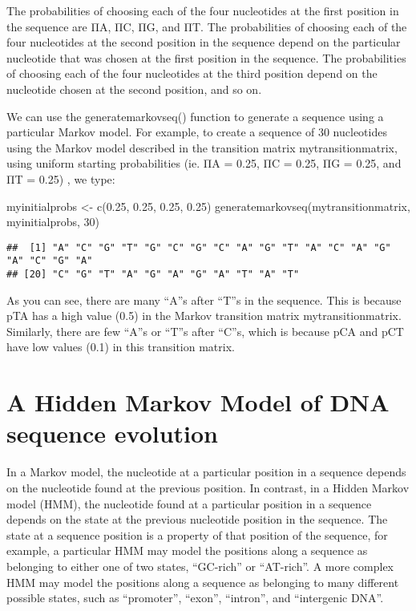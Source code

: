 \documentclass[
]{book}
\newenvironment{Shaded}{\begin{snugshade}}{\end{snugshade}}
\newcommand{\DecValTok}[1]{\textcolor[rgb]{0.00,0.00,0.81}{#1}}
\newcommand{\FloatTok}[1]{\textcolor[rgb]{0.00,0.00,0.81}{#1}}
\newcommand{\FunctionTok}[1]{\textcolor[rgb]{0.00,0.00,0.00}{#1}}
\newcommand{\NormalTok}[1]{#1}
\newcommand{\OtherTok}[1]{\textcolor[rgb]{0.56,0.35,0.01}{#1}}
\begin{document}
The probabilities of choosing each of the four nucleotides at the first position in the sequence are ΠA, ΠC, ΠG, and ΠT. The probabilities of choosing each of the four nucleotides at the second position in the sequence depend on the particular nucleotide that was chosen at the first position in the sequence. The probabilities of choosing each of the four nucleotides at the third position depend on the nucleotide chosen at the second position, and so on.

We can use the generatemarkovseq() function to generate a sequence using a particular Markov model. For example, to create a sequence of 30 nucleotides using the Markov model described in the transition matrix mytransitionmatrix, using uniform starting probabilities (ie. ΠA = 0.25, ΠC = 0.25, ΠG = 0.25, and ΠT = 0.25) , we type:

\begin{Shaded}
\begin{Highlighting}[]
\NormalTok{myinitialprobs }\OtherTok{\textless{}{-}} \FunctionTok{c}\NormalTok{(}\FloatTok{0.25}\NormalTok{, }\FloatTok{0.25}\NormalTok{, }\FloatTok{0.25}\NormalTok{, }\FloatTok{0.25}\NormalTok{)}
\FunctionTok{generatemarkovseq}\NormalTok{(mytransitionmatrix, myinitialprobs, }\DecValTok{30}\NormalTok{)}
\end{Highlighting}
\end{Shaded}

\begin{verbatim}
##  [1] "A" "C" "G" "T" "G" "C" "G" "C" "A" "G" "T" "A" "C" "A" "G" "A" "C" "G" "A"
## [20] "C" "G" "T" "A" "G" "A" "G" "A" "T" "A" "T"
\end{verbatim}

As you can see, there are many ``A''s after ``T''s in the sequence. This is because pTA has a high value (0.5) in the Markov transition matrix mytransitionmatrix. Similarly, there are few ``A''s or ``T''s after ``C''s, which is because pCA and pCT have low values (0.1) in this transition matrix.

\hypertarget{a-hidden-markov-model-of-dna-sequence-evolution}{%
\section{A Hidden Markov Model of DNA sequence evolution}\label{a-hidden-markov-model-of-dna-sequence-evolution}}

In a Markov model, the nucleotide at a particular position in a sequence depends on the nucleotide found at the previous position. In contrast, in a Hidden Markov model (HMM), the nucleotide found at a particular position in a sequence depends on the state at the previous nucleotide position in the sequence. The state at a sequence position is a property of that position of the sequence, for example, a particular HMM may model the positions along a sequence as belonging to either one of two states, ``GC-rich'' or ``AT-rich''. A more complex HMM may model the positions along a sequence as belonging to many different possible states, such as ``promoter'', ``exon'', ``intron'', and ``intergenic DNA''.
\end{document}
